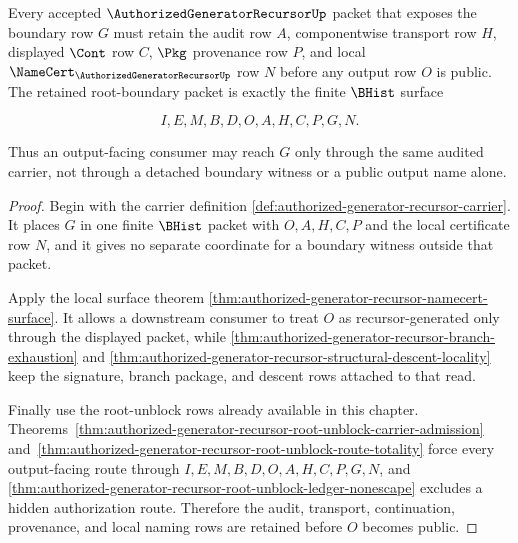 \begin{theorem}
\label{thm:authorized-generator-recursor-boundary-audit-exhaustion}
Every accepted $\AuthorizedGeneratorRecursorUp$ packet that exposes the boundary row $G$ must retain the audit row $A$, componentwise transport row $H$, displayed $\Cont$ row $C$, $\Pkg$ provenance row $P$, and local $\NameCert_{\AuthorizedGeneratorRecursorUp}$ row $N$ before any output row $O$ is public. The retained root-boundary packet is exactly the finite $\BHist$ surface

$$
I,E,M,B,D,O,A,H,C,P,G,N.
$$

Thus an output-facing consumer may reach $G$ only through the same audited carrier, not through a detached boundary witness or a public output name alone.
\end{theorem}
\begin{proof}
Begin with the carrier definition \autoref{def:authorized-generator-recursor-carrier}. It places $G$ in one finite $\BHist$ packet with $O,A,H,C,P$ and the local certificate row $N$, and it gives no separate coordinate for a boundary witness outside that packet.

Apply the local surface theorem \autoref{thm:authorized-generator-recursor-namecert-surface}. It allows a downstream consumer to treat $O$ as recursor-generated only through the displayed packet, while \autoref{thm:authorized-generator-recursor-branch-exhaustion} and \autoref{thm:authorized-generator-recursor-structural-descent-locality} keep the signature, branch package, and descent rows attached to that read.

Finally use the root-unblock rows already available in this chapter. Theorems~\ref{thm:authorized-generator-recursor-root-unblock-carrier-admission} and~\ref{thm:authorized-generator-recursor-root-unblock-route-totality} force every output-facing route through $I,E,M,B,D,O,A,H,C,P,G,N$, and \autoref{thm:authorized-generator-recursor-root-unblock-ledger-nonescape} excludes a hidden authorization route. Therefore the audit, transport, continuation, provenance, and local naming rows are retained before $O$ becomes public.
\end{proof}


